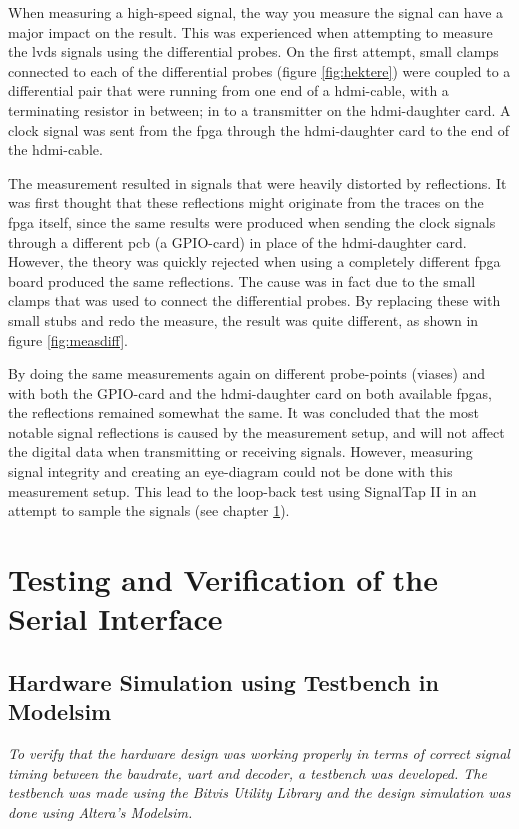 \documentclass[main.tex]{subfiles}
\begin{document}
When measuring a high-speed signal, the way you measure the signal can have a major impact on the result. This was experienced when attempting to measure the \gls{lvds} signals using the differential probes. On the first attempt, small clamps connected to each of the differential probes (figure \ref{fig:hektere}) were coupled to a differential pair that were running from one end of a hdmi-cable, with a terminating resistor in between; in to a transmitter on the \gls{hdmi}-daughter card. A clock signal was sent from the \gls{fpga} through the \gls{hdmi}-daughter card to the end of the hdmi-cable. 

The measurement resulted in signals that were heavily distorted by reflections. It was first thought that these reflections might originate from the traces on the \gls{fpga} itself, since the same results were produced when sending the clock signals through a different \gls{pcb} (a GPIO-card) in place of the \gls{hdmi}-daughter card. However, the theory was quickly rejected when using a completely different \gls{fpga} board produced the same reflections. The cause was in fact due to the small clamps that was used to connect the differential probes. By replacing these with small stubs and redo the measure, the result was quite different, as shown in figure \ref{fig:measdiff}.

By doing the same measurements again on different probe-points (viases) and with both the GPIO-card and the \gls{hdmi}-daughter card on both available \glspl{fpga}, the reflections remained somewhat the same. It was concluded that the most notable signal reflections is caused by the measurement setup, and will not affect the digital data when transmitting or receiving signals. However, measuring signal integrity and creating an eye-diagram could not be done with this measurement setup. This lead to the loop-back test using SignalTap II in an attempt to sample the signals (see chapter \ref{chap:sertest}).

\section{Testing and Verification of the Serial Interface} \label{chap:sertest}

\subsection{Hardware Simulation using Testbench in Modelsim}

\textit{To verify that the hardware design was working properly in terms of correct signal timing between the baudrate, \acrshort{uart} and decoder, a testbench was developed. The testbench was made using the \textit{Bitvis Utility Library} and the design simulation was done using Altera's Modelsim.}
\end{document}

